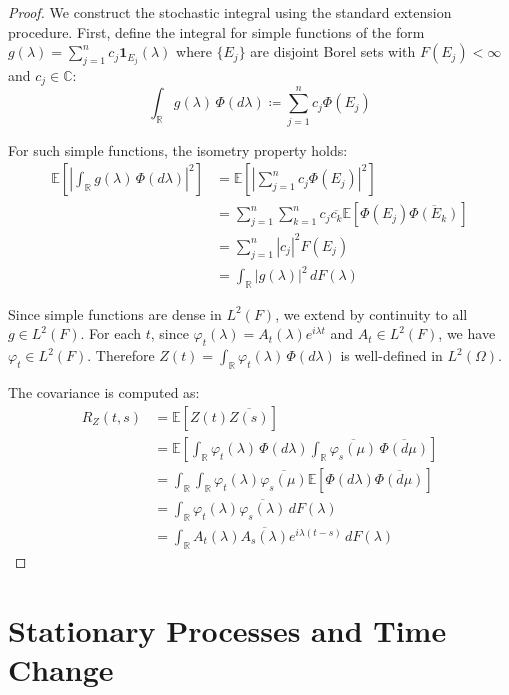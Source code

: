 \documentclass{article}
\begin{document}
\begin{proof}
We construct the stochastic integral using the standard extension procedure. First, define the integral for simple functions of the form $g(\lambda)=\sum_{j=1}^n c_j \mathbf{1}_{E_j}(\lambda)$ where $\{E_j\}$ are disjoint Borel sets with $F(E_j)<\infty$ and $c_j\in\mathbb{C}$:
\[
\int_{\mathbb{R}} g(\lambda)\,\Phi(d\lambda) \coloneqq \sum_{j=1}^n c_j \Phi(E_j)
\]

For such simple functions, the isometry property holds:
\begin{align}
\mathbb{E}\left[\left|\int_{\mathbb{R}} g(\lambda)\,\Phi(d\lambda)\right|^2\right] &= \mathbb{E}\left[\left|\sum_{j=1}^n c_j \Phi(E_j)\right|^2\right]\\
&= \sum_{j=1}^n \sum_{k=1}^n c_j\overline{c_k}\mathbb{E}[\Phi(E_j)\overline{\Phi(E_k)}]\\
&= \sum_{j=1}^n |c_j|^2 F(E_j)\\
&= \int_{\mathbb{R}} |g(\lambda)|^2\,dF(\lambda)
\end{align}

Since simple functions are dense in $L^2(F)$, we extend by continuity to all $g\in L^2(F)$. For each $t$, since $\varphi_t(\lambda)=A_t(\lambda)e^{i\lambda t}$ and $A_t\in L^2(F)$, we have $\varphi_t\in L^2(F)$. Therefore $Z(t)=\int_{\mathbb{R}} \varphi_t(\lambda)\,\Phi(d\lambda)$ is well-defined in $L^2(\Omega)$.

The covariance is computed as:
\begin{align}
R_Z(t,s) &= \mathbb{E}[Z(t)\overline{Z(s)}]\\
&= \mathbb{E}\left[\int_{\mathbb{R}} \varphi_t(\lambda)\,\Phi(d\lambda) \int_{\mathbb{R}} \overline{\varphi_s(\mu)}\,\overline{\Phi(d\mu)}\right]\\
&= \int_{\mathbb{R}} \int_{\mathbb{R}} \varphi_t(\lambda)\overline{\varphi_s(\mu)}\mathbb{E}[\Phi(d\lambda)\overline{\Phi(d\mu)}]\\
&= \int_{\mathbb{R}} \varphi_t(\lambda)\overline{\varphi_s(\lambda)}\,dF(\lambda)\\
&= \int_{\mathbb{R}} A_t(\lambda)\overline{A_s(\lambda)}e^{i\lambda(t-s)}\,dF(\lambda)
\end{align}
\end{proof}

\section{Stationary Processes and Time Change}\label{sec:stationary_timechange}
\end{document}
